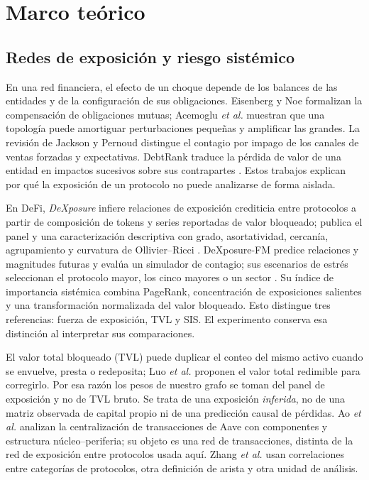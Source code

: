 \documentclass[journal]{IEEEtran}
\begin{document}
\section{Marco teórico}

\subsection{Redes de exposición y riesgo sistémico}

En una red financiera, el efecto de un choque depende de los balances de las
entidades y de la configuración de sus obligaciones. Eisenberg y Noe
\cite{eisenberg2001systemic} formalizan la compensación de obligaciones mutuas;
Acemoglu \emph{et al.} \cite{acemoglu2015systemic} muestran que una topología
puede amortiguar perturbaciones pequeñas y amplificar las grandes. La revisión
de Jackson y Pernoud \cite{jackson2020survey} distingue el contagio por impago
de los canales de ventas forzadas y expectativas. DebtRank traduce la pérdida
de valor de una entidad en impactos sucesivos sobre sus contrapartes
\cite{battiston2012debtrank,bardoscia2015debtrank}. Estos trabajos explican por
qué la exposición de un protocolo no puede analizarse de forma aislada.

En DeFi, \emph{DeXposure} infiere relaciones de exposición crediticia entre
protocolos a partir de composición de tokens y series reportadas de valor
bloqueado; publica el panel y una caracterización descriptiva con grado,
asortatividad, cercanía, agrupamiento y curvatura de Ollivier--Ricci
\cite{wu2025dexposure}. DeXposure-FM predice relaciones y magnitudes futuras y
evalúa un simulador de contagio; sus escenarios de estrés seleccionan el
protocolo mayor, los cinco mayores o un sector \cite{shu2026dexposurefm}. Su
índice de importancia sistémica combina PageRank, concentración de exposiciones
salientes y una transformación normalizada del valor bloqueado. Esto distingue
tres referencias: fuerza de exposición, TVL y SIS. El experimento conserva
esa distinción al interpretar sus comparaciones.

El valor total bloqueado (TVL) puede duplicar el conteo del mismo activo cuando
se envuelve, presta o redeposita; Luo \emph{et al.} \cite{luo2024piercing}
proponen el valor total redimible para corregirlo. Por esa razón los pesos de
nuestro grafo se toman del panel de exposición y no de TVL bruto. Se trata de
una exposición \emph{inferida}, no de una matriz observada de capital propio ni
de una predicción causal de pérdidas. Ao \emph{et al.} \cite{ao2022isdefi}
analizan la centralización de transacciones de Aave con componentes y
estructura núcleo--periferia; su objeto es una red de transacciones, distinta
de la red de exposición entre protocolos usada aquí. Zhang \emph{et al.}
\cite{zhang2026systemicdefi} usan correlaciones entre categorías de protocolos,
otra definición de arista y otra unidad de análisis.
\end{document}
